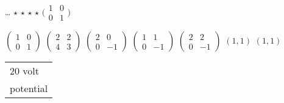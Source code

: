 \documentclass{book}
\begin{document}
\stopmpxshipout
\mpxshipout%
{\scriptsize \ldots}%
\stopmpxshipout
\mpxshipout%
{\scriptsize $\star$}%
\stopmpxshipout
\mpxshipout%
{\scriptsize $\star$}%
\stopmpxshipout
\mpxshipout%
{\scriptsize $\star$}%
\stopmpxshipout
\mpxshipout%
{\scriptsize $\star$}%
\stopmpxshipout
\mpxshipout%
{\tiny $\bigl(\begin{smallmatrix}
                                1  &0  \\
                                0  &1
                              \end{smallmatrix}\bigr)$}%
\stopmpxshipout
\mpxshipout%
\strut{\scriptsize $\displaystyle
                 \begin{pmatrix}
		   1  &0  \\
		   0  &1 
		 \end{pmatrix}$}%
\stopmpxshipout
\mpxshipout%
{\scriptsize $\displaystyle
                 \begin{pmatrix}
		   2  &2  \\
		   4  &3 
		 \end{pmatrix}$}%
\stopmpxshipout
\mpxshipout%
{\scriptsize $\displaystyle
                 \begin{pmatrix}
		   2  &0  \\
		   0  &-1
		 \end{pmatrix}$}%
\stopmpxshipout
\mpxshipout%
{\scriptsize $\displaystyle
                 \begin{pmatrix}
		   1  &1  \\
		   0  &-1
		 \end{pmatrix}$}%
\stopmpxshipout
\mpxshipout%
{\scriptsize $\displaystyle
                 \begin{pmatrix}
		   2  &2  \\
		   0  &-1
		 \end{pmatrix}$}%
\stopmpxshipout
\mpxshipout%
{\scriptsize $(1,1)$}%
\stopmpxshipout
\mpxshipout%
{\scriptsize $(1,1)$}%
\stopmpxshipout
\mpxshipout%
{\small \renewcommand{\arraystretch}{.9}
                \circuitfont\begin{tabular}{@{}l}
                   $20$ volt \\
                   potential
	        \end{tabular}}%
\stopmpxshipout
\mpxshipout%
\end{document}
